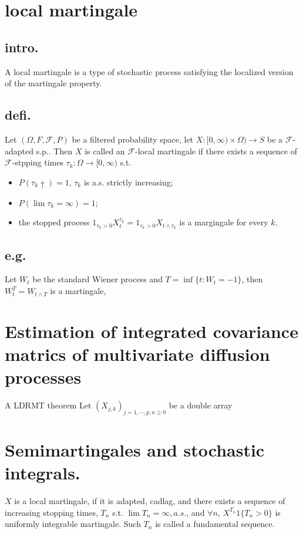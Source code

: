 \documentclass[11pt,a4paper]{article}
\begin{document}
\section{local martingale}
\subsection{intro.}
A local martingale is a type of stochastic process satisfying the localized version of the martingale property.
\subsection{defi.}
Let $(\Omega,F,\mathcal{F},P)$ be a filtered probability space, let $X:[0,\infty)\times \Omega)\to S$ be a $\mathcal{F}$-adapted s.p.. Then $X$ is called an $\mathcal{F}$-local martingale if there exists a sequence of $\mathcal{F}$-stpping times $\tau_k:\Omega\to[0,\infty)$ s.t.
\begin{itemize}
  \item $P(\tau_k \uparrow)=1$, $\tau_k$ is a.s. strictly increasing;
  \item $P(\lim \tau_k=\infty)=1$;
  \item the stopped process $1_{\tau_k>0}X_t^{\tau_k}=1_{\tau_k>0}X_{t\wedge\tau_k}$ is a margingale for every $k$.
\end{itemize}
\subsection{e.g.}
Let $W_t$ be the standard Wiener process and $T=\inf\{t:W_t=-1\}$, then $ W_t^T=W_{t\wedge T} $ is a martingale,


\section{Estimation of integrated covariance matrics of multivariate diffusion processes}
A LDRMT theorem
Let $ (X_{j,k})_{j=1,\cdots,p, n\geq 0} $ be a double array

\section{Semimartingales and stochastic integrals.}
$ X $ is a local martingale, if it is adapted, cadlag, and there exists a sequence of increasing stopping times, $ T_n $ s.t. $ \lim T_n=\infty, a.s. $, and $ \forall n $, $ X^{T_n} 1\{T_n>0 \} $ is uniformly integrable martingale.
Such $ T_n $ is called a fundamental sequence.
\end{document}
